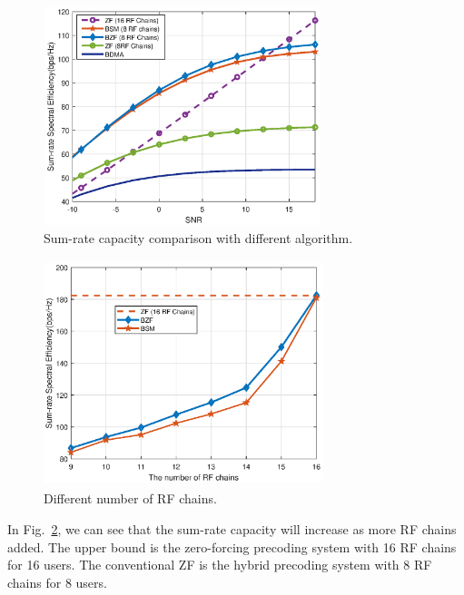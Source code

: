 \documentclass[conference]{IEEEtran}
\begin{document}
{\begin{figure}[ht]
	\begin{center}
		\includegraphics[width=3.2in,height=2.5in]{Figure/comp1path.eps}
		\caption{Sum-rate capacity comparison with different algorithm.}\label{fig:MultiuserGain}
	\end{center}
\end{figure}

\begin{figure}[ht]
	\begin{center}
		\includegraphics[width=3.2in,height=2.6in]{Figure/differentRF1path.eps}
		\caption{Different number of RF chains.}\label{fig:RFchains}
	\end{center}
\end{figure}
In Fig.~\ref{fig:RFchains}, we can see that the sum-rate capacity will increase as more RF chains added. The upper bound is the zero-forcing precoding system with 16 RF chains for 16 users. The conventional ZF is the hybrid precoding system with 8 RF chains for 8 users.

}
\end{document}
